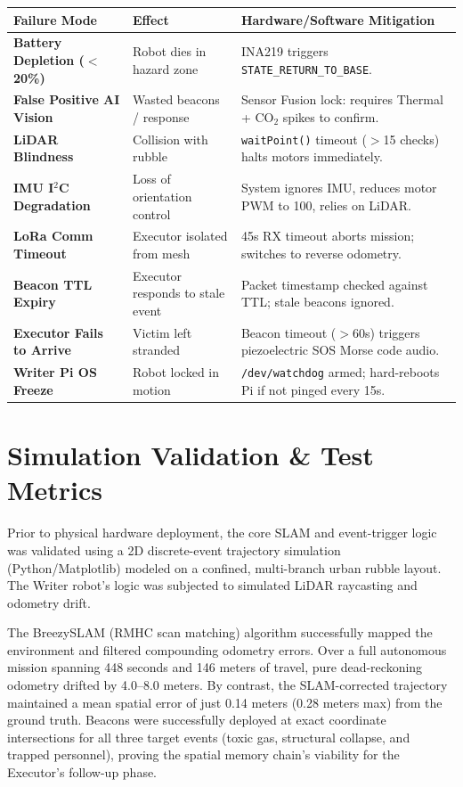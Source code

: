 \documentclass[10pt, letterpaper]{article}
\begin{document}
\begin{center}
\footnotesize
\begin{tabularx}{\textwidth}{@{}p{3.5cm} p{4cm} X@{}}
\toprule
\textbf{Failure Mode} & \textbf{Effect} & \textbf{Hardware/Software Mitigation} \\
\midrule
\textbf{Battery Depletion ($<$20\%)} & Robot dies in hazard zone & INA219 triggers \texttt{STATE\_RETURN\_TO\_BASE}. \\
\textbf{False Positive AI Vision} & Wasted beacons / response & Sensor Fusion lock: requires Thermal + CO$_2$ spikes to confirm. \\
\textbf{LiDAR Blindness} & Collision with rubble & \texttt{waitPoint()} timeout ($>$15 checks) halts motors immediately. \\
\textbf{IMU I$^2$C Degradation} & Loss of orientation control & System ignores IMU, reduces motor PWM to 100, relies on LiDAR. \\
\textbf{LoRa Comm Timeout} & Executor isolated from mesh & 45s RX timeout aborts mission; switches to reverse odometry. \\
\textbf{Beacon TTL Expiry} & Executor responds to stale event & Packet timestamp checked against TTL; stale beacons ignored. \\
\textbf{Executor Fails to Arrive} & Victim left stranded & Beacon timeout ($>$60s) triggers piezoelectric SOS Morse code audio. \\
\textbf{Writer Pi OS Freeze} & Robot locked in motion & \texttt{/dev/watchdog} armed; hard-reboots Pi if not pinged every 15s. \\
\bottomrule
\end{tabularx}
\end{center}

\section{Simulation Validation \& Test Metrics}

Prior to physical hardware deployment, the core SLAM and event-trigger logic was validated using a 2D discrete-event trajectory simulation (Python/Matplotlib) modeled on a confined, multi-branch urban rubble layout. The Writer robot's logic was subjected to simulated LiDAR raycasting and odometry drift.

The BreezySLAM (RMHC scan matching) algorithm successfully mapped the environment and filtered compounding odometry errors. Over a full autonomous mission spanning 448 seconds and 146 meters of travel, pure dead-reckoning odometry drifted by 4.0--8.0 meters. By contrast, the SLAM-corrected trajectory maintained a mean spatial error of just 0.14 meters (0.28 meters max) from the ground truth. Beacons were successfully deployed at exact coordinate intersections for all three target events (toxic gas, structural collapse, and trapped personnel), proving the spatial memory chain's viability for the Executor's follow-up phase.
\end{document}
